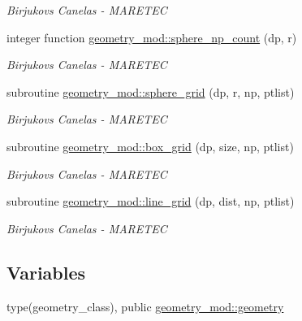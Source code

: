 \begin{DoxyCompactItemize}
\begin{DoxyCompactList}\small\item\em Birjukovs Canelas -\/ M\+A\+R\+E\+T\+EC \end{DoxyCompactList}\item 
integer function \hyperlink{namespacegeometry__mod_a05de7940b4e7df5a2b31f3d0414e3743}{geometry\+\_\+mod\+::sphere\+\_\+np\+\_\+count} (dp, r)
\begin{DoxyCompactList}\small\item\em Birjukovs Canelas -\/ M\+A\+R\+E\+T\+EC \end{DoxyCompactList}\item 
subroutine \hyperlink{namespacegeometry__mod_a6c03a4ea3de6763940396dbeb3908ebc}{geometry\+\_\+mod\+::sphere\+\_\+grid} (dp, r, np, ptlist)
\begin{DoxyCompactList}\small\item\em Birjukovs Canelas -\/ M\+A\+R\+E\+T\+EC \end{DoxyCompactList}\item 
subroutine \hyperlink{namespacegeometry__mod_ae87e4ecff2d21a839da2b82919b5fd0b}{geometry\+\_\+mod\+::box\+\_\+grid} (dp, size, np, ptlist)
\begin{DoxyCompactList}\small\item\em Birjukovs Canelas -\/ M\+A\+R\+E\+T\+EC \end{DoxyCompactList}\item 
subroutine \hyperlink{namespacegeometry__mod_abcb09c0f5274c27cb79b0dd009ed94b3}{geometry\+\_\+mod\+::line\+\_\+grid} (dp, dist, np, ptlist)
\begin{DoxyCompactList}\small\item\em Birjukovs Canelas -\/ M\+A\+R\+E\+T\+EC \end{DoxyCompactList}\end{DoxyCompactItemize}
\subsection*{Variables}
\begin{DoxyCompactItemize}
\item 
type(geometry\+\_\+class), public \hyperlink{namespacegeometry__mod_ad2ad4f7e1138beaad5f37d5c15b7b457}{geometry\+\_\+mod\+::geometry}
\end{DoxyCompactItemize}
